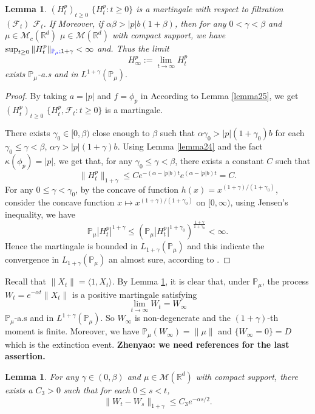 \documentclass[12pt,oneside,english]{amsart}
\theoremstyle{plain}
\newtheorem{lem}[thm]{Lemma}
\theoremstyle{definition}
\numberwithin{equation}{section}
\newcommand{\added}[1]{{\color{blue}#1}}\newcommand{\deleted}[1]{{\color{red}#1}}
\begin{document}
\begin{lem}\label{lemma26}
    \added{$(H^p_t)_{t\geq 0}$} \deleted{$\{H_t^p: t\geq0\}$} is a martingale with respect to \added{filtration $(\mathscr F_t)$} \deleted{$\mathcal{F}_t$}.
    \deleted{If} \added{Moreover, if} $\alpha\beta>|p|b(1+\beta)$, then for any $0< \gamma<\beta$ and \added{$\mu \in \mathcal M_c(\mathbb R^d)$} \deleted{$\mu \in \mathcal{M}(\mathbb{R}^d)$ with compact support}, we have $\sup_{t\geq 0}\|H_t^p\|_{\added{\mathbb P_\mu;}1+\gamma}< \infty$ \added{and}\deleted{. Thus the limit}
$$H_{\infty}^p:=\lim_{t\rightarrow \infty}H_t^p$$
exists $\mathbb{P}_{\mu}$-a.s and in $L^{1+\gamma}(\mathbb{P}_{\mu}).$
\end{lem}
\begin{proof}
    \deleted{By taking $a=|p|$ and $f=\phi_p$ in} \added{According to} Lemma \ref{lemma25}, we get \added{$(H_t^p)_{t\geq 0}$} \deleted{$\{H_t^p, \mathcal{F}_t:t\geq 0\}$} is a martingale.

    There exists $\gamma_0 \in [0,\beta)$ close enough to $\beta$ such that \deleted{$\alpha\gamma_0>|p|(1+\gamma_0)b$} \added{for each $\gamma_0 \leq \gamma < \beta$, $\alpha\gamma>|p|(1+\gamma)b$}.
    Using  Lemma \ref{lemma24} and the fact $\kappa(\phi_p)=|p|$, we get that, for any $\gamma_0\leq\gamma<\beta$\added{, there exists a constant $C$ such that}
    $$\|H_t^p\|_{1+\gamma}\leq Ce^{-(\alpha-|p|b)t}e^{(\alpha-|p|b)t}=C.$$
    For any $0\leq\gamma<\gamma_0$, \deleted{by the concave of function $h(x)=x^{(1+\gamma)/(1+\gamma_0)}$,} \added{consider the concave function $x\mapsto x^{(1+\gamma)/(1+\gamma_0)}$ on $[0,\infty)$, using Jensen's inequality, we have}
    $$\mathbb{P}_{\mu}|H_t^p|^{1+\gamma}\leq(\mathbb{P}_{\mu}|H_t^p|^{1+\gamma_0})^{\frac{1+\gamma}{1+\gamma_0}}<\infty.$$
    Hence the martingale is bounded in $L_{1+\gamma}(\mathbb{P}_{\mu})$ and this indicate the convergence in $L_{1+\gamma}(\mathbb{P}_{\mu}) $ an almost sure,
    according to \cite[Theorem 5.4.5]{Durrett2010Probability}.
\end{proof}


    Recall that $\|X_t\|=\langle 1,X_t\rangle$.
    By Lemma \ref{lemma26},
    it is clear that,
    under $\mathbb{P}_{\mu}$, the process $W_t=e^{-\alpha t}\|X_t\|$ is a positive martingale satisfying
$$\lim_{t\rightarrow \infty} W_t= W_{\infty}$$
$\mathbb{P}_{\mu}$-a.s and in $L^{1+\gamma}(\mathbb{P}_{\mu})$. So $W_{\infty}$ is non-degenerate and the $(1+\gamma)$-th moment is finite. Moreover, we have $\mathbb{P}_{\mu}(W_{\infty})=\|\mu\|$ and $\{W_{\infty}=0\}=D$ which is the extinction event.
    {\bf Zhenyao: we need references for the last assertion.}
\begin{lem}\label{lemma27}
 For any $\gamma\in (0,\beta)$ and $\mu\in \mathcal M(\mathbb R^d)$ with compact support, there exists a $C_3> 0$ such that for each $0\leq s<t$,
 $$\|W_t-W_s\|_{1+\gamma}\leq C_3 e^{-\alpha s/2}.$$
\end{lem}
\end{document}
